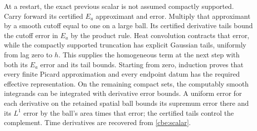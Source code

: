 At a restart, the exact previous scalar is not assumed compactly
supported. Carry forward its certified $E_a$ approximant and error.
Multiply that approximant by a smooth cutoff equal to one on a large
ball. Its certified derivative tails bound the cutoff error in $E_a$
by the product rule. Heat convolution contracts that error, while
the compactly supported truncation has explicit Gaussian tails,
uniformly from lag zero to $h$. This supplies the homogeneous term
at the next step with both its $E_a$ error and its tail bounds.
Starting from zero, induction proves that every finite Picard
approximation and every endpoint datum has the required effective
representation. On the remaining compact sets, the computably smooth
integrands can be integrated with derivative error bounds. A uniform
error for each derivative on the retained spatial ball bounds its
supremum error there and its $L^1$ error by the ball's area times that
error; the certified tails control the complement. Time derivatives
are recovered from \eqref{cbe:scalar}.
